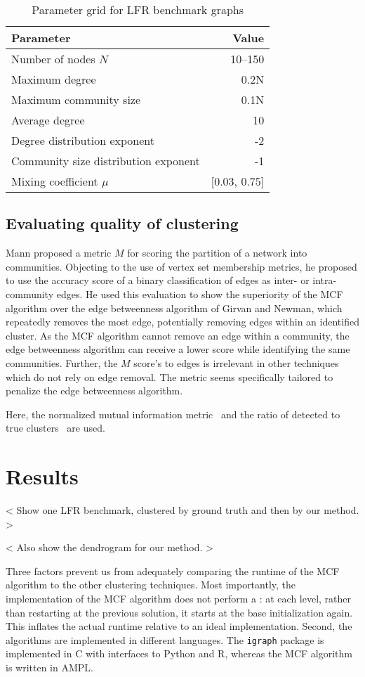 \begin{table}
	\centering
		\begin{tabular}{l r}
		\toprule
		Parameter & Value \\
		\midrule
		Number of nodes $N$ & 10--150 \\
		Maximum degree & 0.2N \\
		Maximum community size & 0.1N \\
		Average degree & 10 \\
		Degree distribution exponent & -2 \\
		Community size distribution exponent & -1 \\
		Mixing coefficient $\mu$ & [0.03, 0.75] \\
		\bottomrule
		\end{tabular}
	\caption{Parameter grid for LFR benchmark graphs}
	\label{tab:Parameter grid}
\end{table}

\subsection{Evaluating quality of clustering}

Mann proposed a metric $M$ for scoring the partition of a network into communities. Objecting to the use of vertex set membership metrics, he proposed to use the accuracy score of a binary classification of edges as inter- or intra-community edges. He used this evaluation to show the superiority of the MCF algorithm over the edge betweenness algorithm of Girvan and Newman, which repeatedly removes the most  edge, potentially removing edges within an identified cluster. As the MCF algorithm cannot remove an edge within a community, the edge betweenness algorithm can receive a lower score while identifying the same communities. Further, the $M$ score's  to edges is irrelevant in other techniques which do not rely on edge removal. The metric seems specifically tailored to penalize the edge betweenness algorithm.

Here, the normalized mutual information metric~\cite{danon2005comparing} and the ratio of detected to true clusters~\cite{yang2016comparative} are used. 

\section{Results}\label{sec:comparison results}

< Show one LFR benchmark, clustered by ground truth and then by our method. >

< Also show the dendrogram for our method. >

Three factors prevent us from adequately comparing the runtime of the MCF algorithm to the other clustering techniques. Most importantly, the implementation of the MCF algorithm does not perform a : at each level, rather than restarting at the previous solution, it starts at the base initialization again. This inflates the actual runtime relative to an ideal implementation. Second, the algorithms are implemented in different languages. The \texttt{igraph} package is implemented in C with interfaces to Python and R, whereas the MCF algorithm is written in AMPL.
